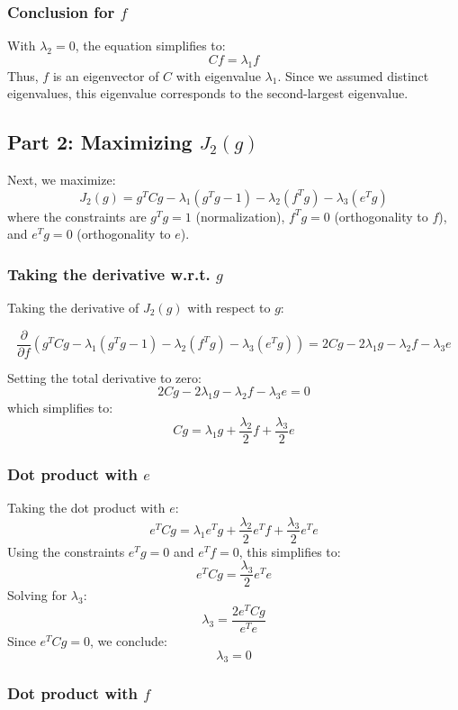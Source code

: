 \documentclass{article}
\begin{document}
\subsubsection*{Conclusion for $f$}

With $\lambda_2 = 0$, the equation simplifies to:
\[
C f = \lambda_1 f
\]
Thus, $f$ is an eigenvector of $C$ with eigenvalue $\lambda_1$. Since we assumed distinct eigenvalues, this eigenvalue corresponds to the second-largest eigenvalue.

\subsection*{Part 2: Maximizing $J_2(g)$}
Next, we maximize:
\[
J_2(g) = g^T C g - {\lambda_1} (g^T g - 1) - \lambda_2 (f^T g) - \lambda_3 (e^T g)
\]
where the constraints are $g^T g = 1$ (normalization), $f^T g = 0$ (orthogonality to $f$), and $e^T g = 0$ (orthogonality to $e$).

\subsubsection*{Taking the derivative w.r.t. $g$}

Taking the derivative of $J_2(g)$ with respect to $g$:

\[
\frac{\partial}{\partial f} (g^T C g - {\lambda_1} (g^T g - 1) - \lambda_2 (f^T g) - \lambda_3 (e^T g)) = 2 C g - 2 {\lambda_1} g - \lambda_2 f - \lambda_3 e 
\]

Setting the total derivative to zero:
\[
2 C g - 2 {\lambda_1} g - \lambda_2 f - \lambda_3 e = 0
\]
which simplifies to:
\[
C g = {\lambda_1} g + \frac{\lambda_2}{2} f + \frac{\lambda_3}{2} e
\]

\subsubsection*{Dot product with $e$}

Taking the dot product with $e$:
\[
e^T C g = {\lambda_1} e^T g + \frac{\lambda_2}{2} e^T f + \frac{\lambda_3}{2} e^T e
\]
Using the constraints $e^T g = 0$ and $e^T f = 0$, this simplifies to:
\[
e^T C g = \frac{\lambda_3}{2} e^T e
\]
Solving for $\lambda_3$:
\[
\lambda_3 = \frac{2 e^T C g}{e^T e}
\]
Since $e^T C g = 0$, we conclude:
\[
\lambda_3 = 0
\]

\subsubsection*{Dot product with $f$}
\end{document}
